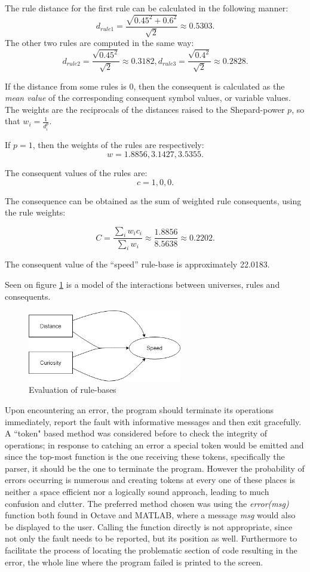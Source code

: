 The rule distance for the first rule can be calculated in the following manner:
\[
	d_{rule1} = \frac{\sqrt{0.45^2 + 0.6^2}}{\sqrt{2}} \approx 0.5303.
\]
\noindent The other two rules are computed in the same way:
\[
	d_{rule2} = \frac{\sqrt{0.45^2}}{\sqrt{2}} \approx 0.3182,
	d_{rule3} = \frac{\sqrt{0.4^2}}{\sqrt{2}} \approx 0.2828.
\]

If the distance from some rules is 0, then the consequent is calculated as the \textit{mean value} of the corresponding consequent symbol values, or variable values. The weights are the reciprocals of the distances raised to the Shepard-power $p$, so that $w_i = \frac{1}{d^p_i}$.

\noindent If $p = 1$, then the weights of the rules are respectively:
 \[
 	w = 1.8856, 3.1427, 3.5355.
 \]

\noindent The consequent values of the rules are:
\[
	c = 1, 0, 0.
\]

\noindent The consequence can be obtained as the sum of weighted rule consequents, using the rule weights:

\[
	C = \frac{\sum_i w_i  c_i}{\sum_i w_i} \approx \frac{1.8856}{8.5638} \approx 0.2202.
\]

\noindent The consequent value of the “speed” rule-base is approximately 22.0183. 

Seen on figure \ref{fig:example} is a model of the interactions between universes, rules and consequents.
\begin{figure}[!h]
	\centering
	\includegraphics[width=0.6\textwidth]{images/example}
	\caption{Evaluation of rule-bases}
	\label{fig:example}
\end{figure}

Upon encountering an error, the program should terminate its operations immediately, report the fault with informative messages and then exit gracefully. A ``token" based method was considered before to check the integrity of operations; in response to catching an error a special token would be emitted and since the top-most function is the one receiving these tokens, specifically the parser, it should be the one to terminate the program. However the probability of errors occurring is numerous and creating tokens at every one of these places is neither a space efficient nor a logically sound approach, leading to much confusion and clutter. The preferred method chosen was using the \textit{error(msg)} function both found in Octave and MATLAB, where a message \textit{msg} would also be displayed to the user. Calling the function directly is not appropriate, since not only the fault needs to be reported, but its position as well. Furthermore to facilitate the process of locating the problematic section of code resulting in the error, the whole line where the program failed is printed to the screen.

